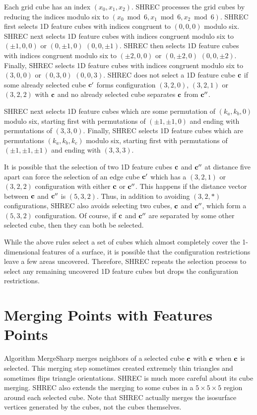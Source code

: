 Each grid cube has an index $(x_0, x_1, x_2)$.
SHREC processes the grid cubes by reducing the indices modulo six
to $(x_0 \bmod 6, x_1 \bmod 6, x_2 \bmod 6)$.
SHREC first selects 1D feature cubes 
with indices congruent to $(0,0,0)$ modulo six.
SHREC next selects 1D feature cubes with indices congruent modulo six
to $(\pm 1,0,0)$ or $(0, \pm 1, 0)$ $(0, 0, \pm 1)$.
SHREC then selects 1D feature cubes with indices congruent modulo six
to $(\pm 2,0,0)$ or $(0, \pm 2, 0)$ $(0, 0, \pm 2)$.
Finally, SHREC selects 1D feature cubes with indices congruent modulo six
to $(3,0,0)$ or $(0, 3, 0)$ $(0, 0, 3)$.
SHREC does not select a 1D feature cube $\mathbf{c}$ 
if some already selected cube $\mathbf{c}'$
forms configuration $(3,2,0)$, $(3,2,1)$ or $(3,2,2)$ with $\mathbf{c}$
and no already selected cube separates $\mathbf{c}$ from $\mathbf{c}''$.

SHREC next selects 1D feature cubes which are some permutation
of $(k_a,k_b,0)$ modulo six,
starting first with permutations of $(\pm 1, \pm 1, 0)$
and ending with permutations of $(3, 3, 0)$.
Finally, SHREC selects 1D feature cubes which are permutations
$(k_a, k_b, k_c)$ modulo six,
starting first with permutations of $(\pm 1, \pm 1, \pm 1)$
and ending with $(3, 3, 3)$.

It is possible that the selection of two 1D feature cubes $\mathbf{c}$ and $\mathbf{c}''$
at distance five apart can force the selection of an edge cube $\mathbf{c}'$
which has a $(3,2,1)$ or $(3,2,2)$ configuration 
with either $\mathbf{c}$ or $\mathbf{c}''$.
This happens if the distance vector between $\mathbf{c}$ and $\mathbf{c}''$
is $(5,3,2)$.
Thus, in addition to avoiding $(3,2,*)$ configurations,
SHREC also avoids selecting two cubes, $\mathbf{c}$ and $\mathbf{c}''$, 
which form a $(5,3,2)$ configuration.
Of course, if $\mathbf{c}$ and $\mathbf{c}''$ are separated by some other selected cube,
then they can both be selected.

While the above rules select a set of cubes which almost completely cover
the 1-dimensional features of a surface,
it is possible that the configuration restrictions leave a few areas uncovered.
Therefore, SHREC repeats the selection process to select any remaining
uncovered 1D feature cubes but drops the configuration restrictions.


\section{Merging Points with Features Points}
\label{section:merging}

Algorithm MergeSharp merges neighbors of a selected cube $\mathbf{c}$ 
with $\mathbf{c}$ when $\mathbf{c}$ is selected.
This merging step sometimes created extremely thin triangles and 
sometimes flips triangle orientations.
SHREC is much more careful about its cube merging.
SHREC also extends the merging to some cubes in a $5 \times 5 \times 5$ region 
around each selected cube.
Note that SHREC actually merges the isosurface vertices generated by the cubes,
not the cubes themselves.

